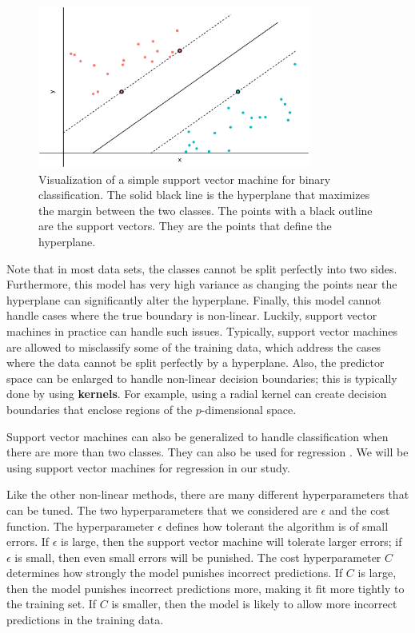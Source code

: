 \documentclass{article}
\begin{document}
\begin{figure}[h!]
	\centering
	\includegraphics[width = 0.8\textwidth]{images/svm.eps}
	\captionsetup{width = 0.8\textwidth}
	\caption{Visualization of a simple support vector machine for binary classification. The solid black line is the hyperplane that maximizes the margin between the two classes. The points with a black outline are the support vectors. They are the points that define the hyperplane.}
	\label{fig:svm}
\end{figure}

Note that in most data sets, the classes cannot be split perfectly into two sides. Furthermore, this model has very high variance as changing the points near the hyperplane can significantly alter the hyperplane. Finally, this model cannot handle cases where the true boundary is non-linear. Luckily, support vector machines in practice can handle such issues. Typically, support vector machines are allowed to misclassify some of the training data, which address the cases where the data cannot be split perfectly by a hyperplane. Also, the predictor space can be enlarged to handle non-linear decision boundaries; this is typically done by using \textbf{kernels}. For example, using a radial kernel can create decision boundaries that enclose regions of the $p$-dimensional space.

Support vector machines can also be generalized to handle classification when there are more than two classes. They can also be used for regression \cite{drucker1997support}. We will be using support vector machines for regression in our study.

Like the other non-linear methods, there are many different hyperparameters that can be tuned. The two hyperparameters that we considered are $\epsilon$ and the cost function. The hyperparameter $\epsilon$ defines how tolerant the algorithm is of small errors. If $\epsilon$ is large, then the support vector machine will tolerate larger errors; if $\epsilon$ is small, then even small errors will be punished. The cost hyperparameter $C$ determines how strongly the model punishes incorrect predictions. If $C$ is large, then the model punishes incorrect predictions more, making it fit more tightly to the training set. If $C$ is smaller, then the model is likely to allow more incorrect predictions in the training data.
\end{document}
